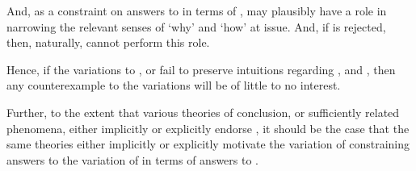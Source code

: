 \begin{note}
  And, as a constraint on answers to \qWhy{} in terms of \qHow{}, \issueInclusion{} may plausibly have a role in narrowing the relevant senses of `why' and `how' at issue.
  And, if \issueInclusion{} is rejected, then, naturally, \issueInclusion{} cannot perform this role.

  Hence, if the variations to \qWhy{}, \qHow{} or \issueInclusion{} fail to preserve intuitions regarding \qWhy{}, \qHow{} and \issueInclusion{}, then any counterexample to the variations will be of little to no interest.

  Further, to the extent that various theories of conclusion, or sufficiently related phenomena, either implicitly or explicitly endorse \issueInclusion{}, it should be the case that the same theories either implicitly or explicitly motivate the variation of \issueConstraint{} constraining answers to the variation of \qWhy{} in terms of answers to \qHow{}.
\end{note}

